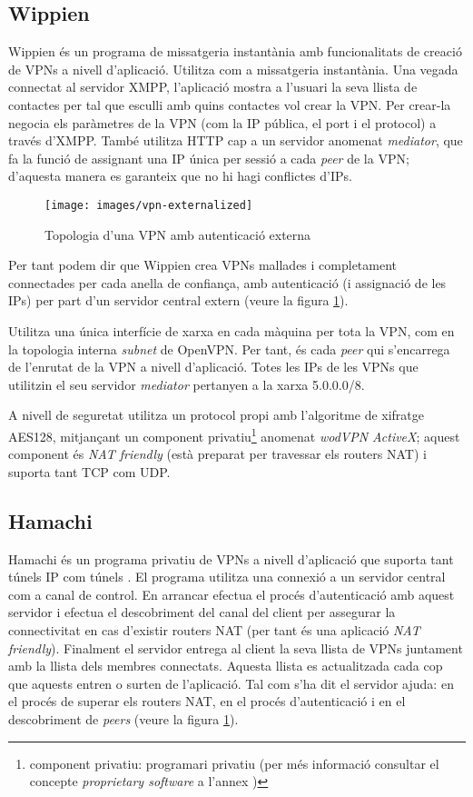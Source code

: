 \subsection{Wippien}
Wippien és un programa de missatgeria instantània amb funcionalitats de creació de VPNs a nivell d'aplicació. Utilitza  com a missatgeria instantània. Una vegada connectat al servidor XMPP, l'aplicació mostra a l'usuari la seva llista de contactes per tal que esculli amb quins contactes vol crear la VPN. Per crear-la negocia els paràmetres de la VPN (com la IP pública, el port i el protocol) a través d'XMPP. També utilitza HTTP cap a un servidor anomenat \emph{mediator}, que fa la funció de  assignant una IP única per sessió a cada \emph{peer} de la VPN; d'aquesta manera es garanteix que no hi hagi conflictes d'IPs.
\begin{figure}[htb]
\centering
\texttt{[image: images/vpn-externalized]}
\caption{Topologia d'una VPN amb autenticació externa}
\label{F:vpn-externalized}
\end{figure}
Per tant podem dir que Wippien crea VPNs mallades i completament connectades per cada anella de confiança, amb autenticació (i assignació de les IPs) per part d'un servidor central extern (veure la figura \ref{F:vpn-externalized}).

Utilitza una única interfície de xarxa en cada màquina per tota la VPN, com en la topologia interna \emph{subnet} de OpenVPN. Per tant, és cada \emph{peer} qui s'encarrega de l'enrutat de la VPN a nivell d'aplicació. Totes les IPs de les VPNs que utilitzin el seu servidor \emph{mediator} pertanyen a la xarxa 5.0.0.0/8.

A nivell de seguretat utilitza un protocol propi amb l'algoritme de xifratge AES128, mitjançant un component privatiu\footnote{component privatiu: programari privatiu (per més informació consultar el concepte \emph{proprietary software} a l'annex )} anomenat \emph{wodVPN ActiveX}; aquest component és \emph{NAT friendly} (està preparat per travessar els routers NAT) i suporta tant TCP com UDP.

\subsection{Hamachi}
Hamachi és un programa privatiu de VPNs a nivell d'aplicació que suporta tant túnels IP com túnels .
El programa utilitza una connexió a un servidor central com a canal de control. En arrancar efectua el procés d'autenticació amb aquest servidor i efectua el descobriment del canal del client per assegurar la connectivitat en cas d'existir routers NAT (per tant és una aplicació \emph{NAT friendly}). Finalment el servidor entrega al client la seva llista de VPNs juntament amb la llista dels membres connectats. Aquesta llista es actualitzada cada cop que aquests entren o surten de l'aplicació. Tal com s'ha dit el servidor ajuda: en el procés de superar els routers NAT, en el procés d'autenticació i en el descobriment de \emph{peers} (veure la figura \ref{F:vpn-externalized}).

